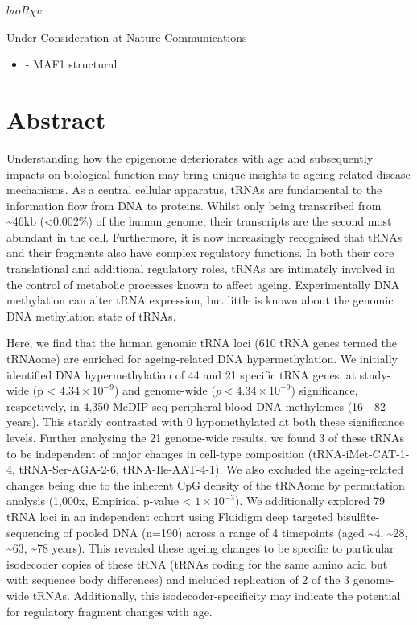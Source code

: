 \documentclass[
]{book}
\providecommand{\tightlist}{%
  \setlength{\itemsep}{0pt}\setlength{\parskip}{0pt}}
\begin{document}
\href{https://doi.org/10.1101/870352}{\(bioR \chi v\)} \citep{Acton2020}

\href{https://nature-research-under-consideration.nature.com/users/37265-nature-communications/posts/57741-the-genomic-loci-of-specific-human-trna-genes-exhibit-ageing-related-dna-hypermethylation}{Under Consideration at Nature Communications}

\begin{itemize}
\tightlist
\item
  \citet{Vorlander2020} - MAF1 structural
\end{itemize}

\newpage

\hypertarget{abstract-2}{%
\section{Abstract}\label{abstract-2}}

Understanding how the epigenome deteriorates with age and subsequently impacts on biological function may bring unique insights to ageing-related disease mechanisms. As a central cellular apparatus, tRNAs are fundamental to the information flow from DNA to proteins.
Whilst only being transcribed from \textasciitilde46kb (\textless0.002\%) of the human genome, their transcripts are the second most abundant in the cell.
Furthermore, it is now increasingly recognised that tRNAs and their fragments also have complex regulatory functions.
In both their core translational and additional regulatory roles, tRNAs are intimately involved in the control of metabolic processes known to affect ageing.
Experimentally DNA methylation can alter tRNA expression, but little is known about the genomic DNA methylation state of tRNAs.

Here, we find that the human genomic tRNA loci (610 tRNA genes termed the tRNAome) are enriched for ageing-related DNA hypermethylation.
We initially identified DNA hypermethylation of 44 and 21 specific tRNA genes, at study-wide (p \textless{} \(4.34\times10^{-9}\)) and genome-wide (\(p < 4.34\times10^{-9}\)) significance, respectively, in 4,350 MeDIP-seq peripheral blood DNA methylomes (16 - 82 years).
This starkly contrasted with 0 hypomethylated at both these significance levels.
Further analysing the 21 genome-wide results, we found 3 of these tRNAs to be independent of major changes in cell-type composition (tRNA-iMet-CAT-1-4, tRNA-Ser-AGA-2-6, tRNA-Ile-AAT-4-1).
We also excluded the ageing-related changes being due to the inherent CpG density of the tRNAome by permutation analysis (1,000x, Empirical p-value \textless{} \(1\times10^{-3}\)).
We additionally explored 79 tRNA loci in an independent cohort using Fluidigm deep targeted bisulfite-sequencing of pooled DNA (n=190) across a range of 4 timepoints (aged \textasciitilde4, \textasciitilde28, \textasciitilde63, \textasciitilde78 years).
This revealed these ageing changes to be specific to particular isodecoder copies of these tRNA (tRNAs coding for the same amino acid but with sequence body differences) and included replication of 2 of the 3 genome-wide tRNAs.
Additionally, this isodecoder-specificity may indicate the potential for regulatory fragment changes with age.
\end{document}
